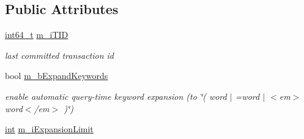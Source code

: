 \subsection*{Public Attributes}
\begin{DoxyCompactItemize}
\item 
\hyperlink{sphinxstd_8h_a996e72f71b11a5bb8b3b7b6936b1516d}{int64\-\_\-t} \hyperlink{classCSphIndex_a44a28e9ee041c291b82c147170b5b54a}{m\-\_\-i\-T\-I\-D}
\begin{DoxyCompactList}\small\item\em last committed transaction id \end{DoxyCompactList}\item 
bool \hyperlink{classCSphIndex_aaa46cd260aa4d007691a6b930a11a540}{m\-\_\-b\-Expand\-Keywords}
\begin{DoxyCompactList}\small\item\em enable automatic query-\/time keyword expansion (to \char`\"{}( word $|$ =word $|$ $<$em$>$word$<$/em$>$ )\char`\"{}) \end{DoxyCompactList}\item 
\hyperlink{sphinxexpr_8cpp_a4a26e8f9cb8b736e0c4cbf4d16de985e}{int} \hyperlink{classCSphIndex_afbfcb87a3e41667ab68764a620f7872a}{m\-\_\-i\-Expansion\-Limit}
\end{DoxyCompactItemize}
